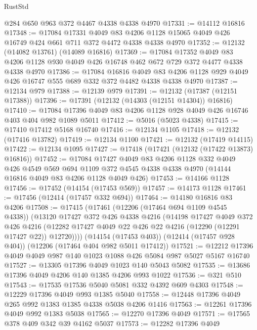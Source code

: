 \begin{lexlean}{RustStd}
\begin{coremodule}
{\begin{coremodule}
{{{{{{{{{{{{{{{{{{{{{{{{{{{{{{{{{{{{{{{{{{{{{{{{{{    @284
    @650
    @963
    @372
    @4467
    @4338
    @4338
    @4970
@17331 := @14112 @16816
@17348 := @17084
    @17331
    @4049
    @83
    @4206
    @1128
    @15065
    @4049
    @426
    @16749
    @424
    @661
    @711
    @372
    @4472
    @4338
    @4338
    @4970
@17352 := @12132 (@14082 @13761) (@14089 @16816)
@17369 := @17084
    @17352
    @4049
    @83
    @4206
    @1128
    @930
    @4049
    @426
    @16748
    @462
    @672
    @729
    @372
    @4477
    @4338
    @4338
    @4970
@17386 := @17084
    @16816
    @4049
    @83
    @4206
    @1128
    @929
    @4049
    @426
    @16747
    @555
    @689
    @332
    @372
    @4482
    @4338
    @4338
    @4970
@17387 := @12134 @979
@17388 := @12139 @979
@17391 := @12132 (@17387 (@12151 @17388))
@17396 := @17391 (@12132 (@14303 (@12151 @14304)) @16816)
@17410 := @17084 @17396 @4049 @83 @4206 @1128 @928 @4049 @426 @16746 @403 @404 @982 @1089 @5011
@17412 := @5016 (@5023 @4338)
@17415 := @17410 @17412 @5168 @16740
@17416 := @12134 @1105
@17418 := @12132 (@17416 @13782)
@17419 := @12134 @1100
@17421 := @12132 (@17419 @14115)
@17422 := @12134 @1095
@17427 := @17418 (@17421 (@12132 (@17422 @13873) @16816))
@17452 := @17084
    @17427
    @4049
    @83
    @4206
    @1128
    @332
    @4049
    @426
    @4549
    @569
    @694
    @1109
    @372
    @4545
    @4338
    @4338
    @4970
    (@14144 @16816 @4049 @83 @4206 @1128 @4049 @426)
@17453 := @14166 @1128
@17456 := @17452 (@14154 (@17453 @569))
@17457 := @14173 @1128
@17461 := @17456 (@12414 (@17457 @332 @694))
@17464 := @14180 @16816 @83 @4206
@17508 := @17415
    (@17461
      (@12206 (@17464 @694 @1109 @4545 @4338))
      (@13120
        @17427
        @372
        @426
        @4338
        @4216
        (@14198
          @17427
          @4049
          @372
          @426
          @4216
          (@12282 @17427 @4049 @22 @426 @22 @4216 (@12290 (@12291 @17427 @22)) @12720))))
    (@14154 (@17453 @403))
    (@12414 (@17457 @928 @404))
    (@12206 (@17464 @404 @982 @5011 @17412))
@17521 := @12212 @17396 @4049 @4049 @987 @140 @1023 @1088 @426 @5084 @987 @5027 @5167 @16740
@17527 := @13305 @17396 @4049 @1023 @140 @5043 @5082
@17535 := @13686 @17396 @4049 @4206 @140 @1385 @4206 @993 @1022
@17536 := @321 @510
@17543 := @17535 @17536 @5040 @5081 @332 @4392 @609 @4303
@17548 := @12229 @17396 @4049 @993 @1385 @5040
@17558 := @12448 @17396 @4049 @265 @992 @1383 @1385 @4338 @5038 @4206 @1416
@17563 := @12261 @17396 @4049 @992 @1383 @5038
@17565 := @12270 @17396 @4049
@17571 := @17565 @378 @409 @342 @39 @4162 @5037
@17573 := @12282 @17396 @4049
}}}}}}}}}}}}}}}}}}}}}}}}}}}}}}}}}}}}}}}}}}}}}}}}}}
\end{coremodule}}
\end{coremodule}
\end{lexlean}
